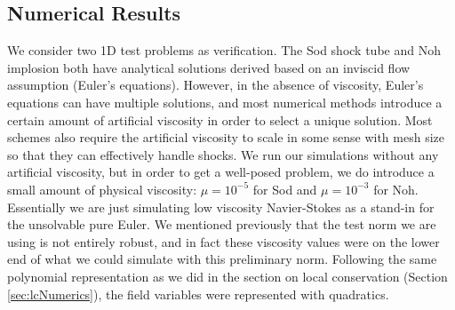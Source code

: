 \documentclass[Proposal.tex]{subfiles}
\begin{document}
%                                                                                    
%                                                                                    
% 
\subsection{Numerical Results}
We consider two 1D test problems as verification.
The Sod shock tube and Noh implosion both have analytical solutions derived based on an inviscid flow assumption (Euler's equations).
However, in the absence of viscosity, Euler's equations can have multiple solutions, and most numerical methods introduce a certain amount of
artificial viscosity in order to select a unique solution.
Most schemes also require the artificial viscosity to scale in some sense with mesh size so that they can effectively handle shocks.
We run our simulations without any artificial viscosity, but in order to get a well-posed problem, we do introduce a small amount of physical
viscosity: $\mu=10^{-5}$ for Sod and $\mu=10^{-3}$ for Noh.
Essentially we are just simulating low viscosity Navier-Stokes as a stand-in for the unsolvable pure Euler.
We mentioned previously that the test norm we are using is not entirely robust, and in fact these viscosity values were on the lower end of what we
could simulate with this preliminary norm.
Following the same polynomial representation as we did in the section on local conservation (Section \ref{sec:lcNumerics}), the field variables were represented with quadratics.
\end{document}
